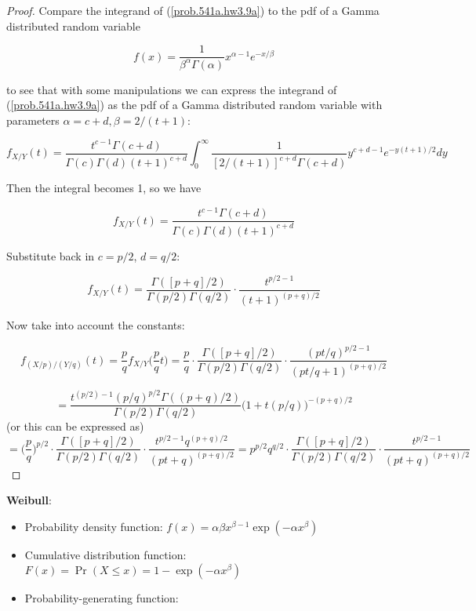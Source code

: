 \begin{itemize}
\begin{proof}
Compare the integrand of (\ref{prob.541a.hw3.9a}) to the pdf of a Gamma distributed random variable

\[
f(x)  = \frac{1}{\beta^\alpha\Gamma(\alpha)} x^{\alpha - 1} e^{-x/\beta}
\]

to see that with some manipulations we can express the integrand of (\ref{prob.541a.hw3.9a}) as the pdf of a Gamma distributed random variable with parameters \(\alpha = c+d, \beta = 2/(t+1)\):

\[
f_{X/Y}(t)    =  \frac{t^{c-1}\Gamma(c+d)     }{ \Gamma(c) \Gamma(d)(t+1)^{c+d}     } \int_0^\infty \frac{1}{[2/(t+1)]^{c+d}\Gamma(c+d)} y^{c+d - 1} e^{-y(t+1)/2} dy
\]

Then the integral becomes 1, so we have

\[
f_{X/Y}(t)  =  \frac{t^{c-1}\Gamma(c+d)     }{ \Gamma(c) \Gamma(d)(t+1)^{c+d}     }
\]

Substitute back in \(c = p/2\), \(d = q/2\):

\[
f_{X/Y}(t)  =  \frac{\Gamma([p+q]/2)  }{\Gamma(p/2)\Gamma(q/2) } \cdot  \frac{t^{p/2-1}   }{  (t+1)^{(p+q)/2} }
\]

Now take into account the constants:

\[
f_{(X/p)/(Y/q)}(t) = \frac{p}{q} f_{X/Y}\bigg( \frac{p}{q} t \bigg) =   \frac{p}{q} \cdot  \frac{\Gamma([p+q]/2)  }{\Gamma(p/2)\Gamma(q/2) } \cdot  \frac{(pt/q)^{p/2-1}   }{  (pt/q+1)^{(p+q)/2} }
\]

\[
= \frac{t^{(p/2)-1}(p/q)^{p/2}\Gamma((p+q)/2)}{\Gamma(p/2)\Gamma(q/2)}\Big(1+t(p/q)\Big)^{-(p+q)/2}
\]
(or this can be expressed as)
\[
 =    \bigg( \frac{p}{q} \bigg)^{p/2} \cdot  \frac{\Gamma([p+q]/2)  }{\Gamma(p/2)\Gamma(q/2) } \cdot  \frac{t^{p/2-1}q^{(p+q)/2}   }{  (pt+q)^{(p+q)/2} }  =   p^{p/2} q^{q/2}  \cdot  \frac{\Gamma([p+q]/2)  }{\Gamma(p/2)\Gamma(q/2) } \cdot  \frac{t^{p/2-1} }{  (pt+q)^{(p+q)/2} }
 \]


\end{proof}



\textbf{Weibull}: 

\begin{itemize}

\item Probability density function: \(f(x) = \alpha\beta x^{\beta - 1} \exp(- \alpha x^\beta) \)

\item Cumulative distribution function: \(F(x) = \Pr(X \leq x) = 1 - \exp(-\alpha x^\beta) \)

\item Probability-generating function:


\end{itemize}
\end{itemize}
